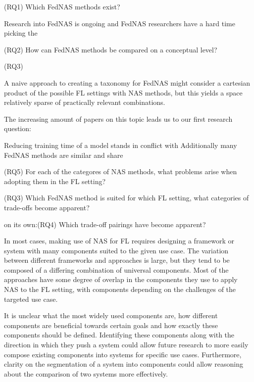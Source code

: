 (RQ1) Which FedNAS methods exist? 

Research into FedNAS is ongoing and FedNAS researchers have a hard time picking the 

(RQ2) How can FedNAS methods be compared on a conceptual level?

(RQ3)


A naive approach to creating a taxonomy for FedNAS might consider a cartesian product of the possible FL settings with NAS methods, but this yields a space relatively sparse of practically relevant combinations.

The increasing amount of papers on this topic leads us to our first research question: 


Reducing training time of a model stands in conflict with  
Additionally many FedNAS methods are similar and share 



(RQ5) For each of the categores of NAS methods, what problems arise when adopting them in the FL setting?

(RQ3) Which FedNAS method is suited for which FL setting, what categories of trade-offs become apparent?

on its own:(RQ4) Which trade-off pairings have become apparent?

In most cases, making use of NAS for FL requires designing a framework or system with many components suited to the given use case. The variation between different frameworks and approaches is large, but they tend to be composed of a differing combination of universal components. Most of the approaches have some degree of overlap in the components they use to apply NAS to the FL setting, with components depending on the challenges of the targeted use case. 

It is unclear what the most widely used components are, how different components are beneficial towards certain goals and how exactly these components should be defined. Identifying these components along with the direction in which they push a system could allow future research to more easily compose existing components into systems for specific use cases. Furthermore, clarity on the segmentation of a system into components could allow reasoning about the comparison of two systems more effectively.


